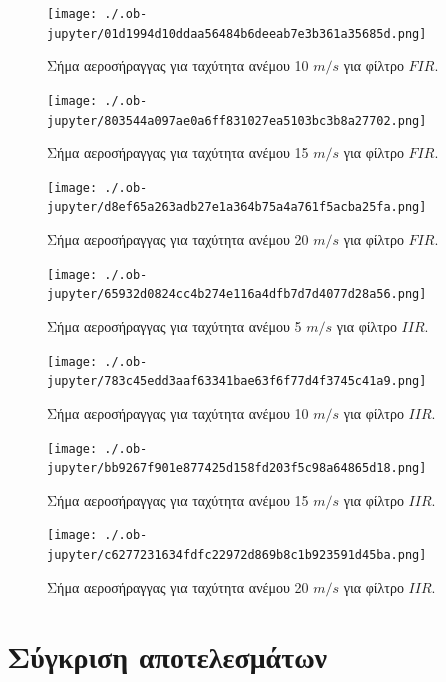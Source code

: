 \documentclass[breaklines=true, 12pt]{article}
\begin{document}
{{{\begin{figure}[htbp]
\centering
\texttt{[image: ./.ob-jupyter/01d1994d10ddaa56484b6deeab7e3b361a35685d.png]}
\caption{\label{fi1_10}Σήμα αεροσήραγγας για ταχύτητα ανέμου 10 \(m/s\) για φίλτρο \(FIR\).}
\end{figure}

\begin{figure}[htbp]
\centering
\texttt{[image: ./.ob-jupyter/803544a097ae0a6ff831027ea5103bc3b8a27702.png]}
\caption{\label{fi1_15}Σήμα αεροσήραγγας για ταχύτητα ανέμου 15 \(m/s\) για φίλτρο \(FIR\).}
\end{figure}

\begin{figure}[htbp]
\centering
\texttt{[image: ./.ob-jupyter/d8ef65a263adb27e1a364b75a4a761f5acba25fa.png]}
\caption{\label{fi1_w20}Σήμα αεροσήραγγας για ταχύτητα ανέμου 20 \(m/s\) για φίλτρο \(FIR\).}
\end{figure}

\begin{figure}[htbp]
\centering
\texttt{[image: ./.ob-jupyter/65932d0824cc4b274e116a4dfb7d7d4077d28a56.png]}
\caption{\label{ii1_w5}Σήμα αεροσήραγγας για ταχύτητα ανέμου 5 \(m/s\) για φίλτρο \(IIR\).}
\end{figure}

\begin{figure}[htbp]
\centering
\texttt{[image: ./.ob-jupyter/783c45edd3aaf63341bae63f6f77d4f3745c41a9.png]}
\caption{\label{ii1_w10}Σήμα αεροσήραγγας για ταχύτητα ανέμου 10 \(m/s\) για φίλτρο \(IIR\).}
\end{figure}

\begin{figure}[htbp]
\centering
\texttt{[image: ./.ob-jupyter/bb9267f901e877425d158fd203f5c98a64865d18.png]}
\caption{\label{ii1_w15}Σήμα αεροσήραγγας για ταχύτητα ανέμου 15 \(m/s\) για φίλτρο \(IIR\).}
\end{figure}

\begin{figure}[htbp]
\centering
\texttt{[image: ./.ob-jupyter/c6277231634fdfc22972d869b8c1b923591d45ba.png]}
\caption{\label{ii1_w20}Σήμα αεροσήραγγας για ταχύτητα ανέμου 20 \(m/s\) για φίλτρο \(IIR\).}
\end{figure}
\clearpage
\section{Σύγκριση αποτελεσμάτων}
\label{sec:org3c55a22}
}}}
\end{document}
